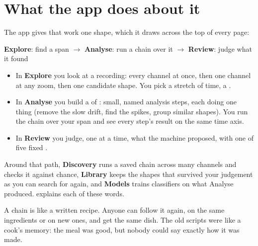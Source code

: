 \section{What the app does about it}\label{sec:why-does}
The app gives that work one shape, which it draws across the top of every page:
\begin{center}\sffamily
\textbf{Explore}: find a span \enskip\ensuremath{\to}\enskip
\textbf{Analyse}: run a chain over it \enskip\ensuremath{\to}\enskip
\textbf{Review}: judge what it found
\end{center}

\begin{itemize}
  \item In \textbf{Explore} you look at a recording: every channel at once, then one channel
    at any zoom, then one candidate shape. You pick a stretch of time, a .
  \item In \textbf{Analyse} you build a  of : small,
    named analysis steps, each doing one thing (remove the slow drift, find the spikes, group
    similar shapes). You run the chain over your span and see every step's result on the
    same time axis.
  \item In \textbf{Review} you judge, one at a time, what the machine proposed, with one of
    five fixed .
\end{itemize}
Around that path, \textbf{Discovery} runs a saved chain across many channels and checks it
against chance, \textbf{Library} keeps the shapes that survived your judgement as
 you can search for again, and \textbf{Models} trains classifiers on
what Analyse produced.  explains each of these words.

\begin{plainterms}
A chain is like a written recipe. Anyone can follow it again, on the same ingredients or on
new ones, and get the same dish. The old scripts were like a cook's memory: the meal was
good, but nobody could say exactly how it was made.
\end{plainterms}

